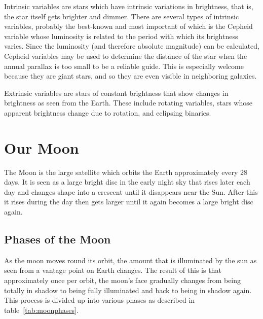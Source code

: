 Intrinsic variables are stars which have intrinsic variations in
brightness, that is, the star itself gets brighter and dimmer. There
are several types of intrinsic variables, probably the best-known and
most important of which is the Cepheid variable whose luminosity is
related to the period with which its brightness varies. Since the
luminosity (and therefore absolute magnitude) can be calculated,
Cepheid variables may be used to determine the distance of the star
when the annual parallax is too small to be a reliable guide. This is
especially welcome because they are giant stars, and so they are even
visible in neighboring galaxies.

Extrinsic variables are stars of constant brightness that show changes
in brightness as seen from the Earth. These include rotating variables,
stars whose apparent brightness change due to rotation, and eclipsing
binaries.

\section{Our Moon}
\label{sec:Moon}

The Moon is the large satellite which orbits the Earth approximately
every 28 days. It is seen as a large bright disc in the early night sky
that rises later each day and changes shape into a crescent until it
disappears near the Sun. After this it rises during the day then gets
larger until it again becomes a large bright disc again.

\subsection{Phases of the Moon}
\label{sec:Moon:Phases}

As the moon moves round its orbit, the amount that is illuminated by the
sun as seen from a vantage point on Earth changes. The result of this is
that approximately once per orbit, the moon's face gradually changes
from being totally in shadow to being fully illuminated and back to
being in shadow again. This process is divided up into various phases as
described in table~\ref{tab:moonphases}.

